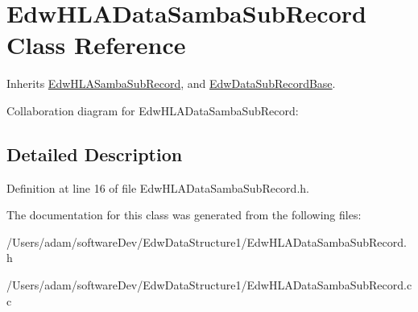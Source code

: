 \hypertarget{class_edw_h_l_a_data_samba_sub_record}{
\section{EdwHLADataSambaSubRecord Class Reference}
\label{class_edw_h_l_a_data_samba_sub_record}
}


Inherits \hyperlink{class_edw_h_l_a_samba_sub_record}{EdwHLASambaSubRecord}, and \hyperlink{class_edw_data_sub_record_base}{EdwDataSubRecordBase}.



Collaboration diagram for EdwHLADataSambaSubRecord:

\subsection{Detailed Description}


Definition at line 16 of file EdwHLADataSambaSubRecord.h.



The documentation for this class was generated from the following files:\begin{DoxyCompactItemize}
\item 
/Users/adam/softwareDev/EdwDataStructure1/EdwHLADataSambaSubRecord.h\item 
/Users/adam/softwareDev/EdwDataStructure1/EdwHLADataSambaSubRecord.cc\end{DoxyCompactItemize}
